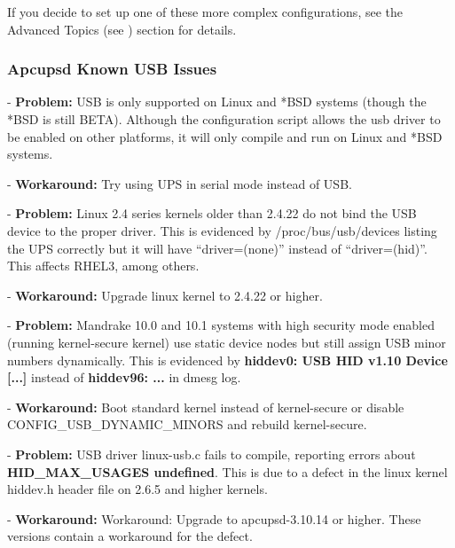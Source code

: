 \footnotesize
\begin{verbatim}
\end{verbatim}
\normalsize

If you decide to set up one of these more complex configurations, see the
Advanced Topics (see 
) section for details. 

\label{Apcupsd-Known-USB-Issues}

\subsubsection*{Apcupsd Known USB Issues}

\label{index-USB-problems-15}
\label{index-Problems_002c-USB-16}
- {\bf Problem:} USB is only supported on Linux and *BSD systems (though the
*BSD is still BETA). Although the configuration script allows the usb driver
to be enabled on other platforms, it will only compile and run on Linux and
*BSD systems.  

- {\bf Workaround:} Try using UPS in serial mode instead of USB.  

- {\bf Problem:} Linux 2.4 series kernels older than 2.4.22 do not bind the
USB device to the proper driver. This is evidenced by /proc/bus/usb/devices
listing the UPS correctly but it will have ``driver=(none)'' instead of
``driver=(hid)''. This affects RHEL3, among others.  

- {\bf Workaround:} Upgrade linux kernel to 2.4.22 or higher.  

- {\bf Problem:} Mandrake 10.0 and 10.1 systems with high security mode
enabled (running kernel-secure kernel) use static device nodes but still
assign USB minor numbers dynamically. This is evidenced by {\bf hiddev0: USB
HID v1.10 Device [...]} instead of {\bf hiddev96: ...} in dmesg log.  

- {\bf Workaround:} Boot standard kernel instead of kernel-secure or disable
CONFIG\_USB\_DYNAMIC\_MINORS and rebuild kernel-secure.  

- {\bf Problem:} USB driver linux-usb.c fails to compile, reporting errors
about {\bf HID\_MAX\_USAGES undefined}. This is due to a defect in the linux
kernel hiddev.h header file on 2.6.5 and higher kernels.  

- {\bf Workaround:} Workaround: Upgrade to apcupsd-3.10.14 or higher.  These
versions contain a workaround for the defect.  

